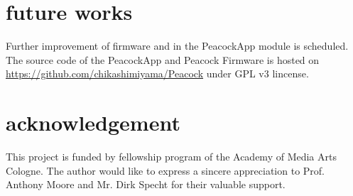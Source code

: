 \documentclass{nime-alternate}
\begin{document}
\section{future works}

Further improvement of firmware and in the PeacockApp module is scheduled.
The source code of the PeacockApp and Peacock Firmware is hosted on \url{https://github.com/chikashimiyama/Peacock} under GPL v3 lincense.

\section{acknowledgement}
This project is funded by fellowship program of the Academy of Media Arts Cologne. The author would like to express a sincere appreciation to Prof. Anthony Moore and Mr. Dirk Specht for their valuable support.



\end{document}
